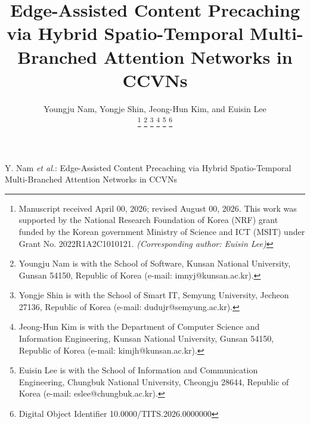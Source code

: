 \documentclass[journal]{IEEEtran}
\begin{document}
\title{Edge-Assisted Content Precaching via Hybrid Spatio-Temporal Multi-Branched Attention Networks in CCVNs}

\newcommand{\orcidauthorA}{0000-0003-3971-0715} %
\newcommand{\orcidauthorB}{0000-0001-7105-6026} %
\newcommand{\orcidauthorC}{0000-0001-8209-5944} %
\newcommand{\orcidauthorD}{0000-0002-0422-0647} %

\author{Youngju Nam, Yongje Shin, Jeong-Hun Kim, and Euisin Lee

\thanks{Manuscript received April 00, 2026; revised August 00, 2026.
This work was supported by the National Research Foundation of Korea (NRF) grant funded by the Korean government Ministry of Science and ICT (MSIT) under Grant No. 2022R1A2C1010121.
\textit{(Corresponding author: Euisin Lee)}}
\thanks{Youngju Nam is with the School of Software, Kunsan National University, Gunsan 54150, Republic of Korea (e-mail: imnyj@kunsan.ac.kr).}
\thanks{Yongje Shin is with the School of Smart IT, Semyung University, Jecheon 27136, Republic of Korea (e-mail: dudujr@semyung.ac.kr).}
\thanks{Jeong-Hun Kim is with the Department of Computer Science and Information Engineering, Kunsan National University, Gunsan 54150, Republic of Korea (e-mail: kimjh@kunsan.ac.kr).}
\thanks{Euisin Lee is with the School of Information and Communication Engineering, Chungbuk National University, Cheongju 28644, Republic of Korea (e-mail: eslee@chungbuk.ac.kr).}
\thanks{Digital Object Identifier 10.0000/TITS.2026.0000000}}

%
{Y. Nam \MakeLowercase{\textit{et al.}}: Edge-Assisted Content Precaching via Hybrid Spatio-Temporal Multi-Branched Attention Networks in CCVNs}


\maketitle
\end{document}
